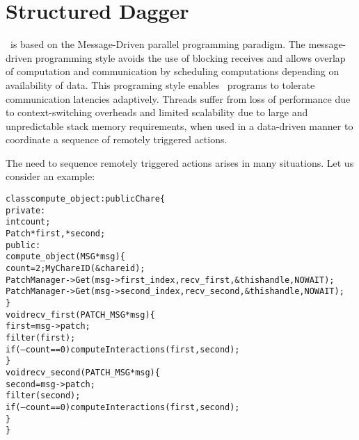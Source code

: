 \section{Structured Dagger}
\label{sec:sdag}

\charmpp\ is based on the Message-Driven parallel programming paradigm.  The
message-driven programming style avoids the use of blocking receives and
allows overlap of computation and communication by scheduling computations
depending on availability of data.  This programing style enables \charmpp\
programs to tolerate communication latencies adaptively. Threads suffer from
loss of performance due to context-switching overheads and limited scalability
due to large and unpredictable stack memory requirements, when used in a
data-driven manner to coordinate a sequence of remotely triggered actions.

The need to sequence remotely triggered actions
arises in many situations. Let us consider an example:

\begin{center}
\begin{alltt}
class compute_object : public Chare \{  
    private:
    int         count;
    Patch       *first, *second;
    public:
    compute_object(MSG *msg) \{
        count = 2; MyChareID(\&chareid);
        PatchManager->Get(msg->first_index, recv_first, \&thishandle,NOWAIT);
        PatchManager->Get(msg->second_index, recv_second, \&thishandle,NOWAIT);
    \}
    void recv_first(PATCH_MSG *msg) \{
        first = msg->patch;
        filter(first);
        if (--count == 0 ) computeInteractions(first,second);
    \} 
    void recv_second(PATCH_MSG *msg)\{
        second = msg->patch;
        filter(second);
        if (--count == 0) computeInteractions(first,second);
    \}
\}
\end{alltt}
\end{center}



